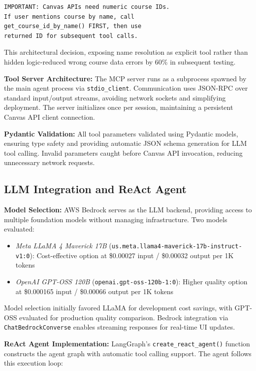 \documentclass{article}
\begin{document}
\begin{verbatim}
IMPORTANT: Canvas APIs need numeric course IDs.
If user mentions course by name, call 
get_course_id_by_name() FIRST, then use 
returned ID for subsequent tool calls.
\end{verbatim}

This architectural decision, exposing name resolution as explicit tool rather than hidden logic-reduced wrong course data errors by 60\% in subsequent testing.


\textbf{Tool Server Architecture:} The MCP server runs as a subprocess spawned by the main agent process via \texttt{stdio\_client}. Communication uses JSON-RPC over standard input/output streams, avoiding network sockets and simplifying deployment. The server initializes once per session, maintaining a persistent Canvas API client connection.

\textbf{Pydantic Validation:} All tool parameters validated using Pydantic models, ensuring type safety and providing automatic JSON schema generation for LLM tool calling. Invalid parameters caught before Canvas API invocation, reducing unnecessary network requests.

\subsection{LLM Integration and ReAct Agent}

\textbf{Model Selection:} AWS Bedrock serves as the LLM backend, providing access to multiple foundation models without managing infrastructure. Two models evaluated:

\begin{itemize}
    \item \textit{Meta LLaMA 4 Maverick 17B} (\texttt{us.meta.llama4-maverick-17b-instruct-v1:0}): Cost-effective option at \$0.00027 input / \$0.00032 output per 1K tokens
    \item \textit{OpenAI GPT-OSS 120B} (\texttt{openai.gpt-oss-120b-1:0}): Higher quality option at \$0.000165 input / \$0.00066 output per 1K tokens
\end{itemize}

Model selection initially favored LLaMA for development cost savings, with GPT-OSS evaluated for production quality comparison. Bedrock integration via \texttt{ChatBedrockConverse} enables streaming responses for real-time UI updates.

\textbf{ReAct Agent Implementation:} LangGraph's \texttt{create\_react\_agent()} function constructs the agent graph with automatic tool calling support. The agent follows this execution loop:
\end{document}
